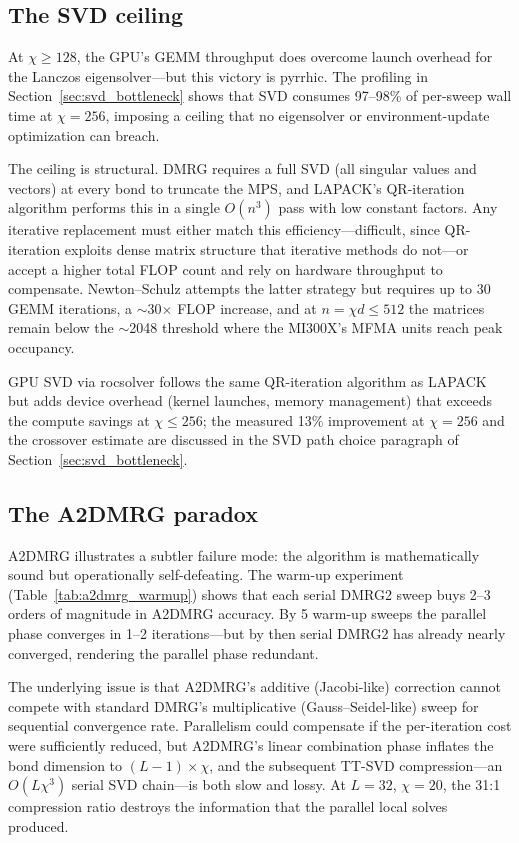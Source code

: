 \documentclass[preprint,12pt]{elsarticle}
\begin{document}
\subsection{The SVD ceiling}
\label{sec:svd_ceiling}

At $\chi \geq 128$, the GPU's GEMM throughput does overcome launch overhead for the Lanczos eigensolver---but this victory is pyrrhic.  The profiling in Section~\ref{sec:svd_bottleneck} shows that SVD consumes 97--98\% of per-sweep wall time at $\chi = 256$, imposing a ceiling that no eigensolver or environment-update optimization can breach.

The ceiling is structural.  DMRG requires a full SVD (all singular values and vectors) at every bond to truncate the MPS, and LAPACK's QR-iteration algorithm \cite{Anderson1999} performs this in a single $O(n^3)$ pass with low constant factors.  Any iterative replacement must either match this efficiency---difficult, since QR-iteration exploits dense matrix structure that iterative methods do not---or accept a higher total FLOP count and rely on hardware throughput to compensate.  Newton--Schulz attempts the latter strategy but requires up to 30 GEMM iterations, a $\sim$30$\times$ FLOP increase, and at $n = \chi d \leq 512$ the matrices remain below the $\sim$2048 threshold where the MI300X's MFMA units reach peak occupancy.

GPU SVD via rocsolver follows the same QR-iteration algorithm as LAPACK but adds device overhead (kernel launches, memory management) that exceeds the compute savings at $\chi \leq 256$; the measured 13\% improvement at $\chi = 256$ and the crossover estimate are discussed in the SVD path choice paragraph of Section~\ref{sec:svd_bottleneck}.

\subsection{The A2DMRG paradox}
\label{sec:a2dmrg_paradox}

A2DMRG \cite{Grigori2025} illustrates a subtler failure mode: the algorithm is mathematically sound but operationally self-defeating.  The warm-up experiment (Table~\ref{tab:a2dmrg_warmup}) shows that each serial DMRG2 sweep buys 2--3 orders of magnitude in A2DMRG accuracy.  By 5 warm-up sweeps the parallel phase converges in 1--2 iterations---but by then serial DMRG2 has already nearly converged, rendering the parallel phase redundant.

The underlying issue is that A2DMRG's additive (Jacobi-like) correction cannot compete with standard DMRG's multiplicative (Gauss--Seidel-like) sweep for sequential convergence rate.  Parallelism could compensate if the per-iteration cost were sufficiently reduced, but A2DMRG's linear combination phase inflates the bond dimension to $(L-1) \times \chi$, and the subsequent TT-SVD compression---an $O(L \chi^3)$ serial SVD chain---is both slow and lossy.  At $L = 32$, $\chi = 20$, the 31:1 compression ratio destroys the information that the parallel local solves produced.
\end{document}

